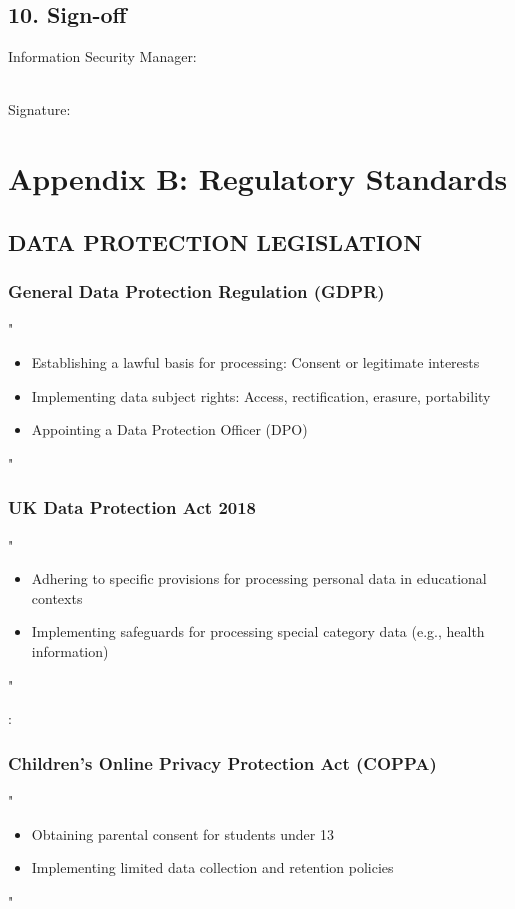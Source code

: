 \documentclass[14pt,a4paper]{article}
\begin{document}
\subsection*{10. Sign-off}

Information Security Manager:

\vspace{2cm}
\noindent\makebox[8cm]{\hrulefill}
\vspace{0.2cm}
\\\noindent Signature:


\newpage

\section{Appendix B: Regulatory Standards}\label{appendix:b}

\subsection*{DATA PROTECTION LEGISLATION}

\subsubsection*{General Data Protection Regulation (GDPR)}
"
\begin{itemize}
    \item Establishing a lawful basis for processing: Consent or legitimate interests
    \item Implementing data subject rights: Access, rectification, erasure, portability
    \item Appointing a Data Protection Officer (DPO)
\end{itemize}
"

\textit{\parencite{EU2016}}

\subsubsection*{UK Data Protection Act 2018}
"
\begin{itemize}
    \item Adhering to specific provisions for processing personal data in educational contexts
    \item Implementing safeguards for processing special category data (e.g., health information)
\end{itemize}
"

\textit{\parencite{UKGov2018}}:

\subsubsection*{Children's Online Privacy Protection Act (COPPA)}
"
\begin{itemize}
    \item Obtaining parental consent for students under 13
    \item Implementing limited data collection and retention policies
\end{itemize}
"
\end{document}
